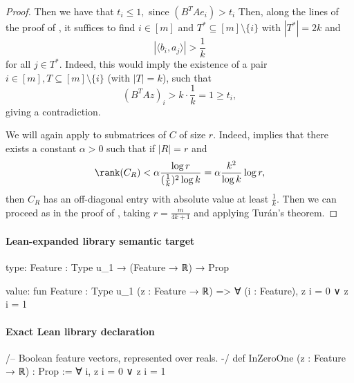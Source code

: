 \documentclass[10pt]{article}
\begin{document}
\begin{ReviewVerbatim}
\begin{proof}
    Then we have that $t_i \le 1,$ since $(B^TAe_i) > t_i$ Then, along the lines of the proof of , it suffices to find $i\in [m]$ and $T^*\subseteq [m]\setminus \{i\}$ with $|T^*|=2k$ and
    \begin{equation}
        |\langle b_i, a_j \rangle| > \frac{1}{k}
    \end{equation}
    for all $j\in T^*$. Indeed, this would imply the existence of a pair $i\in [m], T\subseteq [m]\setminus\{i\}$ (with $|T|=k$), such that
    \begin{equation}
        (B^TAz)_i > k\cdot \frac{1}{k} = 1 \ge t_i,
    \end{equation}
    giving a contradiction.

    We will again apply  to submatrices of $C$ of size $r$. Indeed,  implies that there exists a constant $\alpha > 0$ such that if $|R|=r$ and
    \begin{equation}
        \rank(C_R) < \alpha \frac{\log r}{(\frac{1}{k})^2\log k} = \alpha \frac{k^2}{\log k}\log r,
    \end{equation}
    then $C_R$ has an off-diagonal entry with absolute value at least $\frac{1}{k}.$ Then we can proceed as in the proof of , taking $r = \frac{m}{4k+1}$ and applying Tur\'an's theorem.
\end{proof}
\end{ReviewVerbatim}



\paragraph{Lean-expanded library semantic target}
\begin{ReviewVerbatim}
type:
{Feature : Type u_1} → (Feature → ℝ) → Prop

value:
fun {Feature : Type u_1} (z : Feature → ℝ) => ∀ (i : Feature), z i = 0 ∨ z i = 1
\end{ReviewVerbatim}

\paragraph{Exact Lean library declaration}
\begin{ReviewVerbatim}
/-- Boolean feature vectors, represented over reals. -/
def InZeroOne (z : Feature → ℝ) : Prop :=
  ∀ i, z i = 0 ∨ z i = 1
\end{ReviewVerbatim}
\end{document}
